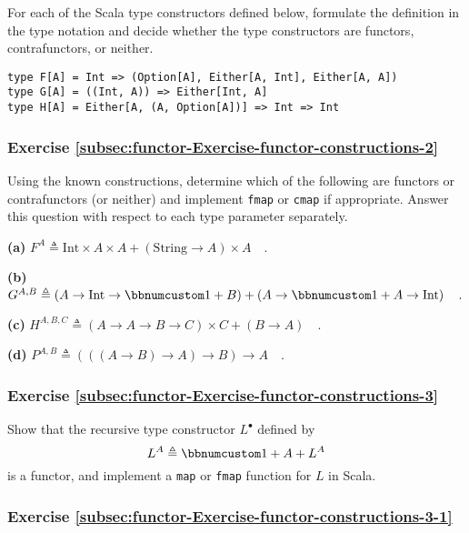 For each of the Scala type constructors defined below, formulate the
definition in the type notation and decide whether the type constructors
are functors, contrafunctors, or neither.
\begin{lstlisting}
type F[A] = Int => (Option[A], Either[A, Int], Either[A, A])
type G[A] = ((Int, A)) => Either[Int, A]
type H[A] = Either[A, (A, Option[A])] => Int => Int
\end{lstlisting}


\subsubsection{Exercise \label{subsec:functor-Exercise-functor-constructions-2}\ref{subsec:functor-Exercise-functor-constructions-2}}

Using the known constructions, determine which of the following are
functors or contrafunctors (or neither) and implement \lstinline!fmap!
or \lstinline!cmap! if appropriate. Answer this question with respect
to each type parameter separately.

\textbf{(a)} $F^{A}\triangleq\text{Int}\times A\times A+(\text{String}\rightarrow A)\times A\quad.$

\textbf{(b)} $G^{A,B}\triangleq\left(A\rightarrow\text{Int}\rightarrow\bbnum 1+B\right)+\left(A\rightarrow\bbnum 1+A\rightarrow\text{Int}\right)\quad.$

\textbf{(c)} $H^{A,B,C}\triangleq\left(A\rightarrow A\rightarrow B\rightarrow C\right)\times C+\left(B\rightarrow A\right)\quad.$

\textbf{(d)} $P^{A,B}\triangleq\left(\left(\left(A\rightarrow B\right)\rightarrow A\right)\rightarrow B\right)\rightarrow A\quad.$

\subsubsection{Exercise \label{subsec:functor-Exercise-functor-constructions-3}\ref{subsec:functor-Exercise-functor-constructions-3}}

Show that the recursive type constructor $L^{\bullet}$ defined by
\[
L^{A}\triangleq\bbnum 1+A+L^{A}
\]
is a functor, and implement a \lstinline!map! or \lstinline!fmap!
function for $L$ in Scala.

\subsubsection{Exercise \label{subsec:functor-Exercise-functor-constructions-3-1}\ref{subsec:functor-Exercise-functor-constructions-3-1}}

